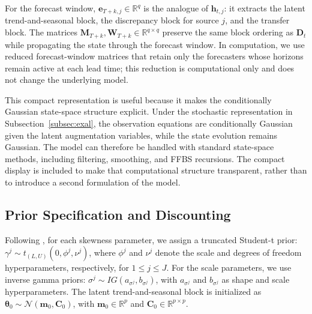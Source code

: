 \documentclass[APA,STIX1COL]{WileyNJD-v2}
\begin{document}
For the forecast window, \(\mathbf{e}_{T+k,j} \in \mathbb{R}^{q}\) is the analogue of \(\mathbf{h}_{t,j}\): it extracts the latent trend-and-seasonal block, the discrepancy block for source \(j\), and the transfer block. The matrices \(\boldsymbol{M}_{T+k}, \mathbf{W}_{T+k} \in \mathbb{R}^{q\times q}\) preserve the same block ordering as \(\boldsymbol{D}_t\) while propagating the state through the forecast window. In computation, we use reduced forecast-window matrices that retain only the forecasters whose horizons remain active at each lead time; this reduction is computational only and does not change the underlying model.

This compact representation is useful because it makes the conditionally Gaussian state-space structure explicit. Under the stochastic representation in Subsection~\ref{subsec:exal}, the observation equations are conditionally Gaussian given the latent augmentation variables, while the state evolution remains Gaussian. The model can therefore be handled with standard state-space methods, including filtering, smoothing, and FFBS recursions. The compact display is included to make that computational structure transparent, rather than to introduce a second formulation of the model.

\subsection{Prior Specification and Discounting}
\label{subsec:prioranddisc}
Following \citet{barata2021_flex_quantile}, for each skewness parameter, we assign a truncated Student-t prior: \(\gamma^j \sim t_{(L, U)}(0, \phi^j, \nu^j)\), where $\phi^j$ and $\nu^j$ denote the scale and degrees of freedom hyperparameters, respectively, for \(1 \leq j \leq J\). For the scale parameters, we use inverse gamma priors: \(\sigma^j \sim IG(a_{\sigma^j}, b_{\sigma^j})\), with $a_{\sigma^j}$ and $b_{\sigma^j}$ as shape and scale hyperparameters. The latent trend-and-seasonal block is initialized as \(\boldsymbol{\theta}_0 \sim \mathcal{N}(\mathbf{m}_0, \mathbf{C}_0)\), with \(\mathbf{m}_0 \in \mathbb{R}^{p}\) and \(\mathbf{C}_0 \in \mathbb{R}^{p\times p}\).
\end{document}
